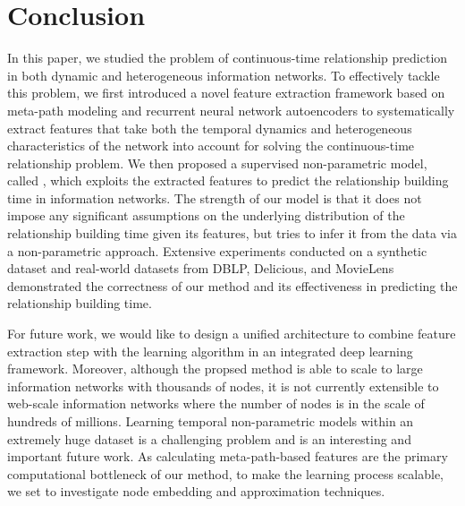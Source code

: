 \section{Conclusion}\label{sec:conclusion}
In this paper, we studied the problem of continuous-time relationship prediction in both dynamic and heterogeneous information networks. To effectively tackle this problem, we first introduced a novel feature extraction framework based on meta-path modeling and recurrent neural network autoencoders to systematically extract features that take both the temporal dynamics and heterogeneous characteristics of the network into account for solving the continuous-time relationship problem. We then proposed a supervised non-parametric model, called \npglm, which exploits the extracted features to predict the relationship building time in information networks. The strength of our model is that it does not impose any significant assumptions on the underlying distribution of the relationship building time given its features, but tries to infer it from the data via a non-parametric approach. Extensive experiments conducted on a synthetic dataset and real-world datasets from DBLP, Delicious, and MovieLens demonstrated the correctness of our method and its effectiveness in predicting the relationship building time.

{\color{red}For future work, we would like to design a unified architecture to combine feature extraction step with the learning algorithm in an integrated deep learning framework. Moreover, although the propsed method is able to scale to large information networks with thousands of nodes, it is not currently extensible to web-scale information networks where the number of nodes is in the scale of hundreds of millions. Learning temporal non-parametric models within an extremely huge dataset is a challenging problem and is an interesting and important future work. As calculating meta-path-based features are the primary computational bottleneck of our method, to make the learning process scalable, we set to investigate node embedding and approximation techniques.}
